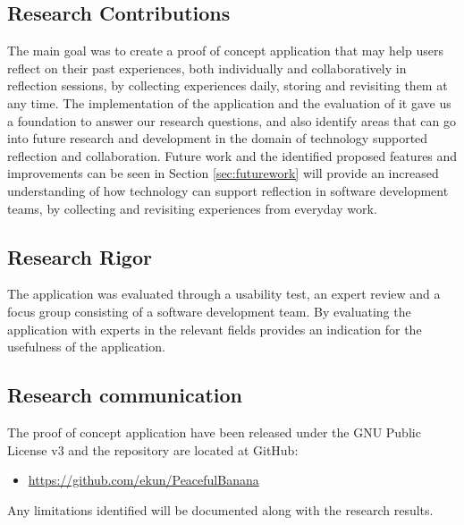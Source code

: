 \subsection{Research Contributions}
The main goal was to create a proof of concept application that may help users reflect on their past experiences, both individually and collaboratively in reflection sessions, by collecting experiences daily, storing and revisiting them at any time. The implementation of the application and the evaluation of it gave us a foundation to answer our research questions, and also identify areas that can go into future research and development in the domain of technology supported reflection and collaboration. 
Future work  and the identified proposed features and improvements can be seen in Section \ref{sec:futurework}
 will provide an increased understanding of how technology can support reflection in software development teams, by collecting and revisiting experiences from everyday work. 

\subsection{Research Rigor}
The application was evaluated through a usability test, an expert review and a focus group consisting of a software development team. By evaluating the application with experts in the relevant fields provides an indication for the usefulness of the application.

\subsection{Research communication}
The proof of concept application have been released under the GNU Public License v3 and the repository are located at GitHub: 
\begin{itemize}
	\item \url{https://github.com/ekun/PeacefulBanana}
\end{itemize} 
Any limitations identified  will be documented along with the research results. 



